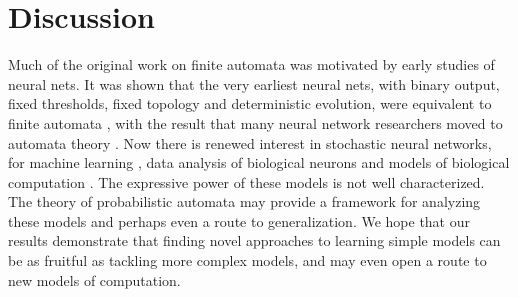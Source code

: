 \section{Discussion}

Much of the original work on finite automata was motivated by early studies of neural nets.  It was shown that the very earliest neural nets, with binary output, fixed thresholds, fixed topology and deterministic evolution, were equivalent to finite automata \cite{Hopcroft}, with the result that many neural network researchers moved to automata theory \cite{?}.  Now there is renewed interest in stochastic neural networks, for machine learning \cite{Hinton}, data analysis of biological neurons \cite{Paninski} and models of biological computation \cite{Pouget? Lengyel? Fiser?}.  The expressive power of these models is not well characterized.  The theory of probabilistic automata may provide a framework for analyzing these models and perhaps even a route to generalization.  We hope that our results demonstrate that finding novel approaches to learning simple models can be as fruitful as tackling more complex models, and may even open a route to new models of computation.